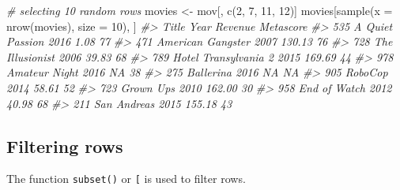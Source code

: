 \documentclass[
]{book}
\newenvironment{Shaded}{\begin{snugshade}}{\end{snugshade}}
\newcommand{\AttributeTok}[1]{\textcolor[rgb]{0.77,0.63,0.00}{#1}}
\newcommand{\CommentTok}[1]{\textcolor[rgb]{0.56,0.35,0.01}{\textit{#1}}}
\newcommand{\DecValTok}[1]{\textcolor[rgb]{0.00,0.00,0.81}{#1}}
\newcommand{\FunctionTok}[1]{\textcolor[rgb]{0.00,0.00,0.00}{#1}}
\newcommand{\NormalTok}[1]{#1}
\newcommand{\OtherTok}[1]{\textcolor[rgb]{0.56,0.35,0.01}{#1}}
\begin{document}
\begin{Shaded}
\begin{Highlighting}[]
\CommentTok{\# selecting 10 random rows}
\NormalTok{movies }\OtherTok{\textless{}{-}}\NormalTok{ mov[, }\FunctionTok{c}\NormalTok{(}\DecValTok{2}\NormalTok{, }\DecValTok{7}\NormalTok{, }\DecValTok{11}\NormalTok{, }\DecValTok{12}\NormalTok{)]}
\NormalTok{movies[}\FunctionTok{sample}\NormalTok{(}\AttributeTok{x =} \FunctionTok{nrow}\NormalTok{(movies), }\AttributeTok{size =} \DecValTok{10}\NormalTok{), ]}
\CommentTok{\#\textgreater{}                    Title Year Revenue Metascore}
\CommentTok{\#\textgreater{} 535      A Quiet Passion 2016    1.08        77}
\CommentTok{\#\textgreater{} 471    American Gangster 2007  130.13        76}
\CommentTok{\#\textgreater{} 728      The Illusionist 2006   39.83        68}
\CommentTok{\#\textgreater{} 789 Hotel Transylvania 2 2015  169.69        44}
\CommentTok{\#\textgreater{} 978        Amateur Night 2016      NA        38}
\CommentTok{\#\textgreater{} 275            Ballerina 2016      NA        NA}
\CommentTok{\#\textgreater{} 905              RoboCop 2014   58.61        52}
\CommentTok{\#\textgreater{} 723            Grown Ups 2010  162.00        30}
\CommentTok{\#\textgreater{} 958         End of Watch 2012   40.98        68}
\CommentTok{\#\textgreater{} 211          San Andreas 2015  155.18        43}
\end{Highlighting}
\end{Shaded}

\hypertarget{br-filter-rows}{%
\subsection{Filtering rows}\label{br-filter-rows}}

The function \texttt{subset()} or \texttt{{[}} is used to filter rows.
\end{document}
